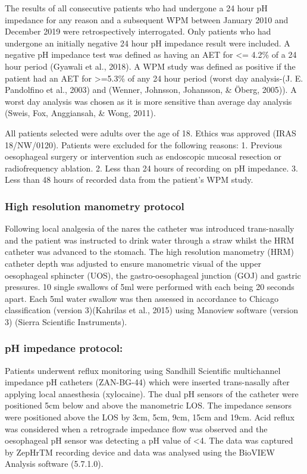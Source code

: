 \documentclass[english,man,floatsintext]{apa6}
\begin{document}
The results of all consecutive patients who had undergone a 24 hour pH impedance for any reason and a subsequent WPM between January 2010 and December 2019 were retrospectively interrogated. Only patients who had undergone an initially negative 24 hour pH impedance result were included. A negative pH impedance test was defined as having an AET for \textless{}= 4.2\% of a 24 hour period (Gyawali et al., 2018). A WPM study was defined as positive if the patient had an AET for \textgreater{}=5.3\% of any 24 hour period (worst day analysis-(J. E. Pandolfino et al., 2003) and (Wenner, Johnsson, Johansson, \& Öberg, 2005)). A worst day analysis was chosen as it is more sensitive than average day analysis (Sweis, Fox, Anggiansah, \& Wong, 2011).

All patients selected were adults over the age of 18. Ethics was approved (IRAS 18/NW/0120). Patients were excluded for the following reasons: 1. Previous oesophageal surgery or intervention such as endoscopic mucosal resection or radiofrequency ablation. 2. Less than 24 hours of recording on pH impedance. 3. Less than 48 hours of recorded data from the patient's WPM study.

\hypertarget{high-resolution-manometry-protocol}{%
\subsubsection{High resolution manometry protocol}\label{high-resolution-manometry-protocol}}

Following local analgesia of the nares the catheter was introduced trans-nasally and the patient was instructed to drink water through a straw whilst the HRM catheter was advanced to the stomach. The high resolution manometry (HRM) catheter depth was adjusted to ensure manometric visual of the upper oesophageal sphincter (UOS), the gastro-oesophageal junction (GOJ) and gastric pressures. 10 single swallows of 5ml were performed with each being 20 seconds apart. Each 5ml water swallow was then assessed in accordance to Chicago classification (version 3)(Kahrilas et al., 2015) using Manoview software (version 3) (Sierra Scientific Instruments).

\hypertarget{ph-impedance-protocol}{%
\subsubsection{pH impedance protocol:}\label{ph-impedance-protocol}}

Patients underwent reflux monitoring using Sandhill Scientific multichannel impedance pH catheters (ZAN-BG-44) which were inserted trans-nasally after applying local anaesthesia (xylocaine). The dual pH sensors of the catheter were positioned 5cm below and above the manometric LOS. The impedance sensors were positioned above the LOS by 3cm, 5cm, 9cm, 15cm and 19cm. Acid reflux was considered when a retrograde impedance flow was observed and the oesophageal pH sensor was detecting a pH value of \textless{}4. The data was captured by ZepHrTM recording device and data was analysed using the BioVIEW Analysis software (5.7.1.0).
\end{document}
